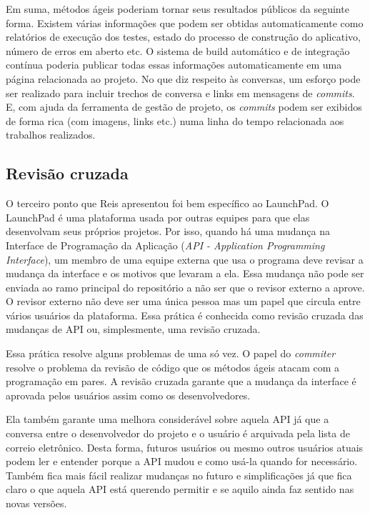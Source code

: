 Em suma, métodos ágeis poderiam tornar seus resultados públicos da
seguinte forma. Existem várias informações que podem ser obtidas
automaticamente como relatórios de execução dos testes, estado do
processo de construção do aplicativo, número de erros em aberto etc.
O sistema de build automático e de integração contínua poderia
publicar todas essas informações automaticamente em uma página
relacionada ao projeto. No que diz respeito às conversas, um esforço
pode ser realizado para incluir trechos de conversa e links em
mensagens de \textit{commits}. E, com ajuda da ferramenta de gestão de
projeto, os \textit{commits} podem ser exibidos de forma rica (com
imagens, links etc.) numa linha do tempo relacionada aos trabalhos
realizados.

\subsection{Revisão cruzada}
\label{subsec:crossrev}

O terceiro ponto que Reis apresentou foi bem específico ao
LaunchPad. O LaunchPad é uma plataforma usada por outras equipes para
que elas desenvolvam seus próprios projetos. Por isso, quando há uma
mudança na Interface de Programação da Aplicação (\emph{API -
  Application Programming Interface}), um membro de uma equipe externa
que usa o programa deve revisar a mudança da interface e os motivos
que levaram a ela. Essa mudança não pode ser enviada ao ramo principal
do repositório a não ser que o revisor externo a aprove. O revisor
externo não deve ser uma única pessoa mas um papel que circula entre
vários usuários da plataforma. Essa prática é conhecida como revisão
cruzada das mudanças de API ou, simplesmente, uma revisão cruzada.

Essa prática resolve alguns problemas de uma só vez. O papel do
\emph{commiter} resolve o problema da revisão de código que os métodos
ágeis atacam com a programação em pares. A revisão cruzada garante que
a mudança da interface é aprovada pelos usuários assim como os
desenvolvedores.

Ela também garante uma melhora considerável sobre aquela API já que a
conversa entre o desenvolvedor do projeto e o usuário é arquivada pela
lista de correio eletrônico. Desta forma, futuros usuários ou mesmo
outros usuários atuais podem ler e entender porque a API mudou e como
usá-la quando for necessário. Também fica mais fácil realizar mudanças
no futuro e simplificações já que fica claro o que aquela API está
querendo permitir e se aquilo ainda faz sentido nas novas versões.

